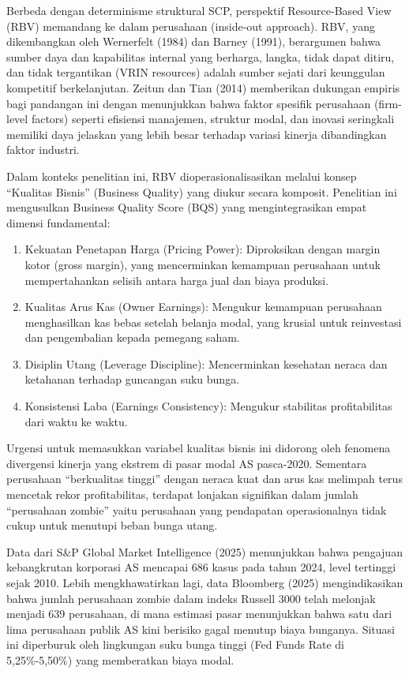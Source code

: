 \documentclass[12pt,a4paper]{report}
\providecommand{\tightlist}{%
  \setlength{\itemsep}{0pt}\setlength{\parskip}{0pt}%
}
\begin{document}
Berbeda dengan determinisme struktural SCP, perspektif Resource-Based
View (RBV) memandang ke dalam perusahaan (inside-out approach). RBV,
yang dikembangkan oleh Wernerfelt (1984) dan Barney (1991), berargumen
bahwa sumber daya dan kapabilitas internal yang berharga, langka, tidak
dapat ditiru, dan tidak tergantikan (VRIN resources) adalah sumber
sejati dari keunggulan kompetitif berkelanjutan. Zeitun dan Tian (2014)
memberikan dukungan empiris bagi pandangan ini dengan menunjukkan bahwa
faktor spesifik perusahaan (firm-level factors) seperti efisiensi
manajemen, struktur modal, dan inovasi seringkali memiliki daya jelaskan
yang lebih besar terhadap variasi kinerja dibandingkan faktor industri.

Dalam konteks penelitian ini, RBV dioperasionalisasikan melalui konsep
``Kualitas Bisnis'' (Business Quality) yang diukur secara komposit.
Penelitian ini mengusulkan Business Quality Score (BQS) yang
mengintegrasikan empat dimensi fundamental:

\begin{enumerate}
\def\labelenumi{\arabic{enumi}.}
\tightlist
\item
  Kekuatan Penetapan Harga (Pricing Power): Diproksikan dengan margin
  kotor (gross margin), yang mencerminkan kemampuan perusahaan untuk
  mempertahankan selisih antara harga jual dan biaya produksi.
\item
  Kualitas Arus Kas (Owner Earnings): Mengukur kemampuan perusahaan
  menghasilkan kas bebas setelah belanja modal, yang krusial untuk
  reinvestasi dan pengembalian kepada pemegang saham.
\item
  Disiplin Utang (Leverage Discipline): Mencerminkan kesehatan neraca
  dan ketahanan terhadap guncangan suku bunga.
\item
  Konsistensi Laba (Earnings Consistency): Mengukur stabilitas
  profitabilitas dari waktu ke waktu.
\end{enumerate}

Urgensi untuk memasukkan variabel kualitas bisnis ini didorong oleh
fenomena divergensi kinerja yang ekstrem di pasar modal AS pasca-2020.
Sementara perusahaan ``berkualitas tinggi'' dengan neraca kuat dan arus
kas melimpah terus mencetak rekor profitabilitas, terdapat lonjakan
signifikan dalam jumlah ``perusahaan zombie'' yaitu perusahaan yang
pendapatan operasionalnya tidak cukup untuk menutupi beban bunga utang.

Data dari S\&P Global Market Intelligence (2025) menunjukkan bahwa
pengajuan kebangkrutan korporasi AS mencapai 686 kasus pada tahun 2024,
level tertinggi sejak 2010. Lebih mengkhawatirkan lagi, data Bloomberg
(2025) mengindikasikan bahwa jumlah perusahaan zombie dalam indeks
Russell 3000 telah melonjak menjadi 639 perusahaan, di mana estimasi
pasar menunjukkan bahwa satu dari lima perusahaan publik AS kini
berisiko gagal menutup biaya bunganya. Situasi ini diperburuk oleh
lingkungan suku bunga tinggi (Fed Funds Rate di 5,25\%-5,50\%) yang
memberatkan biaya modal.
\end{document}
